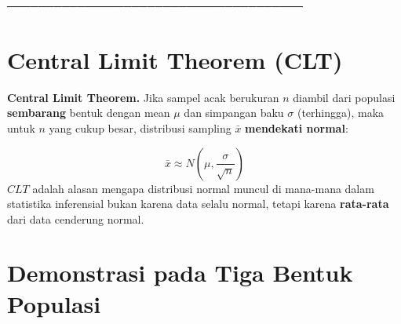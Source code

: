 \documentclass[
  indonesian,
  letterpaper,
]{book}
\begin{document}
──────────────────────────────────────

\section{Central Limit Theorem (CLT)}\label{central-limit-theorem-clt}

\textbf{Central Limit Theorem.} Jika sampel acak berukuran \(n\) diambil
dari populasi \textbf{sembarang} bentuk dengan mean \(\mu\) dan
simpangan baku \(\sigma\) (terhingga), maka untuk \(n\) yang cukup
besar, distribusi sampling \(\bar{x}\) \textbf{mendekati normal}:

\[\bar{x} \approx N\left(\mu, \dfrac{\sigma}{\sqrt{n}}\right)\] \(CLT\)
adalah alasan mengapa distribusi normal muncul di mana-mana dalam
statistika inferensial bukan karena data selalu normal, tetapi karena
\textbf{rata-rata} dari data cenderung normal.

\section{Demonstrasi pada Tiga Bentuk
Populasi}\label{demonstrasi-pada-tiga-bentuk-populasi}
\end{document}
